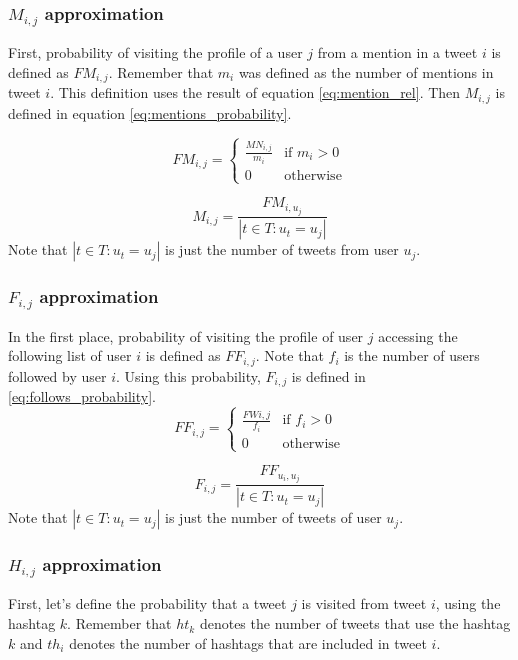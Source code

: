 \subsubsection*{$M_{i,j}$ approximation}
First, probability of visiting the profile of a user $j$ from a mention in a tweet $i$ is defined as $FM_{i,j}$. Remember that $m_i$ was defined as the number of mentions in tweet $i$. This definition uses the result of equation \ref{eq:mention_rel}. Then $M_{i,j}$ is defined in equation \ref{eq:mentions_probability}.

\begin{equation}
FM_{i,j} = \begin{cases}
\frac{MN_{i,j}}{m_i} & \text{if } m_i > 0 \\
0 & \text{otherwise}
\end{cases}
\end{equation}

\begin{equation}\label{eq:mentions_probability}
M_{i,j} = \frac{FM_{i, u_j}}{ |t \in T : u_t = u_j|}
\end{equation}
Note that $|t \in T : u_t = u_j|$ is just the number of tweets from user $u_j$.

\subsubsection*{$F_{i,j}$ approximation}
In the first place, probability of visiting the profile of user $j$ accessing the following list of user $i$ is defined as $FF_{i,j}$. Note that $f_i$ is the number of users followed by user $i$. Using this probability, $F_{i,j}$ is defined in \ref{eq:follows_probability}.
\begin{equation}
FF_{i,j} = \begin{cases}
\frac{FW{i,j}}{f_i} & \text{if } f_i > 0 \\
0 & \text{otherwise}
\end{cases}
\end{equation}

\begin{equation}\label{eq:follows_probability}
F_{i,j} = \frac{FF_{u_i, u_j}}{ |t \in T : u_t = u_j|}
\end{equation}
Note that $|t \in T : u_t = u_j|$ is just the number of tweets of user $u_j$.

\subsubsection*{$H_{i,j}$ approximation}
First, let's define the probability that a tweet $j$ is visited from tweet $i$, using the hashtag $k$. Remember that $ht_k$ denotes the number of tweets that use the hashtag $k$ and $th_i$ denotes the number of hashtags that are included in tweet $i$.

